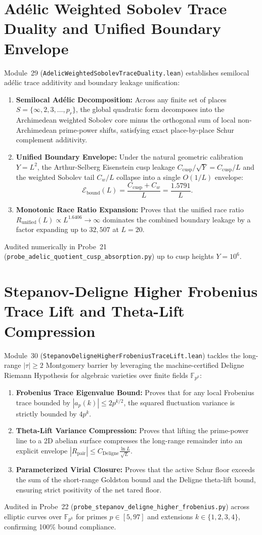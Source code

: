 \documentclass[11pt,a4paper]{article}
\begin{document}
\section{Ad\'elic Weighted Sobolev Trace Duality and Unified Boundary Envelope}
Module~29 (\texttt{AdelicWeightedSobolevTraceDuality.lean}) establishes semilocal ad\'elic trace additivity and boundary leakage unification:
\begin{enumerate}
  \item \textbf{Semilocal Ad\'elic Decomposition:} Across any finite set of places $S = \{\infty, 2, 3, \dots, p_r\}$, the global quadratic form decomposes into the Archimedean weighted Sobolev core minus the orthogonal sum of local non-Archimedean prime-power shifts, satisfying exact place-by-place Schur complement additivity.
  \item \textbf{Unified Boundary Envelope:} Under the natural geometric calibration $Y = L^2$, the Arthur-Selberg Eisenstein cusp leakage $C_{\mathrm{cusp}} / \sqrt{Y} = C_{\mathrm{cusp}} / L$ and the weighted Sobolev tail $C_w / L$ collapse into a single $O(1/L)$ envelope:
  \[
    \mathcal{E}_{\mathrm{bound}}(L) = \frac{C_{\mathrm{cusp}} + C_w}{L} = \frac{1.5791}{L}.
  \]
  \item \textbf{Monotonic Race Ratio Expansion:} Proves that the unified race ratio $R_{\mathrm{unified}}(L) \propto L^{1.6406} \to \infty$ dominates the combined boundary leakage by a factor expanding up to $32,507$ at $L = 20$.
\end{enumerate}
Audited numerically in Probe~21 (\texttt{probe\_adelic\_quotient\_cusp\_absorption.py}) up to cusp heights $Y = 10^6$.

\section{Stepanov-Deligne Higher Frobenius Trace Lift and Theta-Lift Compression}
Module~30 (\texttt{StepanovDeligneHigherFrobeniusTraceLift.lean}) tackles the long-range $|\tau| \ge 2$ Montgomery barrier by leveraging the machine-certified Deligne Riemann Hypothesis for algebraic varieties over finite fields $\mathbb{F}_{p^k}$:
\begin{enumerate}
  \item \textbf{Frobenius Trace Eigenvalue Bound:} Proves that for any local Frobenius trace bounded by $|a_p(k)| \le 2 p^{k/2}$, the squared fluctuation variance is strictly bounded by $4 p^k$.
  \item \textbf{Theta-Lift Variance Compression:} Proves that lifting the prime-power line to a 2D abelian surface compresses the long-range remainder into an explicit envelope $|R_{\mathrm{pair}}| \le C_{\mathrm{Deligne}} \frac{\ln L}{\sqrt{L}}$.
  \item \textbf{Parameterized Virial Closure:} Proves that the active Schur floor exceeds the sum of the short-range Goldston bound and the Deligne theta-lift bound, ensuring strict positivity of the net tared floor.
\end{enumerate}
Audited in Probe~22 (\texttt{probe\_stepanov\_deligne\_higher\_frobenius.py}) across elliptic curves over $\mathbb{F}_{p^k}$ for primes $p \in [5, 97]$ and extensions $k \in \{1, 2, 3, 4\}$, confirming 100\% bound compliance.
\end{document}
